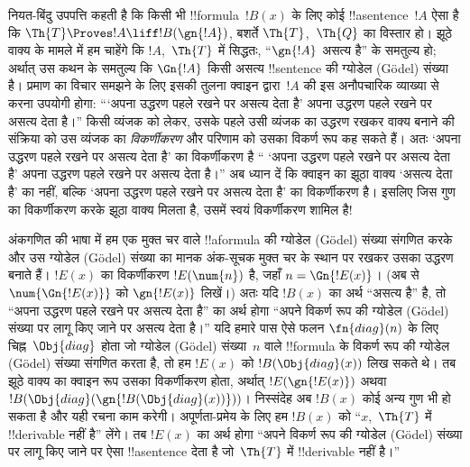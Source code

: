 \documentclass[../../../include/open-logic-section]{subfiles}
\begin{document}


\begin{explain}
नियत-बिंदु उपपत्ति कहती है कि किसी भी !!{formula}~$!B(x)$ के लिए कोई
!!a{sentence}~$!A$ ऐसा है कि
$\Th{T} \Proves !A \liff !B(\gn{!A})$, बशर्ते $\Th{T}$,~$\Th{Q}$ का
विस्तार हो। झूठे वाक्य के मामले में हम चाहेंगे कि $!A$,~$\Th{T}$ में
सिद्धतः, ``$\gn{!A}$ असत्य है'' के समतुल्य हो; अर्थात् उस कथन के समतुल्य
कि $\Gn{!A}$ किसी असत्य !!{sentence} की ग्योडेल (G\"odel) संख्या है।
प्रमाण का विचार समझने के लिए इसकी तुलना क्वाइन द्वारा~$!A$ की इस अनौपचारिक
व्याख्या से करना उपयोगी होगा: ```अपना उद्धरण पहले रखने पर असत्य देता है'
अपना उद्धरण पहले रखने पर असत्य देता है।'' किसी व्यंजक को लेकर, उसके पहले
उसी व्यंजक का उद्धरण रखकर वाक्य बनाने की संक्रिया को उस व्यंजक का
\emph{विकर्णीकरण} और परिणाम को उसका विकर्ण रूप कह सकते हैं। अतः `अपना
उद्धरण पहले रखने पर असत्य देता है' का विकर्णीकरण है `` `अपना उद्धरण पहले
रखने पर असत्य देता है' अपना उद्धरण पहले रखने पर असत्य देता है।'' अब ध्यान
दें कि क्वाइन का झूठा वाक्य `असत्य देता है' का नहीं, बल्कि `अपना उद्धरण
पहले रखने पर असत्य देता है' का विकर्णीकरण है। इसलिए जिस गुण का
विकर्णीकरण करके झूठा वाक्य मिलता है, उसमें स्वयं विकर्णीकरण शामिल है!{}

अंकगणित की भाषा में हम एक मुक्त चर वाले !!a{formula} की ग्योडेल (G\"odel)
संख्या संगणित करके और उस ग्योडेल (G\"odel) संख्या का मानक अंक-सूचक मुक्त चर के
स्थान पर रखकर उसका उद्धरण बनाते हैं। $!E(x)$ का विकर्णीकरण
$!E(\num{n})$ है, जहाँ $n = \Gn{!E(x)}$। (अब से
$\num{\Gn{!E(x)}}$ को $\gn{!E(x)}$ लिखें।) अतः यदि $!B(x)$ का अर्थ
``असत्य है'' है, तो ``अपना उद्धरण पहले रखने पर असत्य देता है'' का अर्थ
होगा ``अपने विकर्ण रूप की ग्योडेल (G\"odel) संख्या पर लागू किए जाने पर असत्य देता
है।'' यदि हमारे पास ऐसे फलन $\fn{diag}(n)$ के लिए चिह्न~$\Obj{diag}$ होता
जो ग्योडेल (G\"odel) संख्या~$n$ वाले !!{formula} के विकर्ण रूप की ग्योडेल (G\"odel) संख्या
संगणित करता है, तो हम $!E(x)$ को $!B(\Obj{diag}(x))$ लिख सकते थे। तब झूठे
वाक्य का क्वाइन रूप उसका विकर्णीकरण होता, अर्थात्
$!E(\gn{!E(x)})$ अथवा
$!B(\Obj{diag}(\gn{!B(\Obj{diag}(x))}))$। निस्संदेह अब $!B(x)$ कोई अन्य
गुण भी हो सकता है और यही रचना काम करेगी। अपूर्णता-प्रमेय के लिए हम
$!B(x)$ को ``$x$,~$\Th{T}$ में !!{derivable} नहीं है'' लेंगे। तब $!E(x)$
का अर्थ होगा ``अपने विकर्ण रूप की ग्योडेल (G\"odel) संख्या पर लागू किए जाने पर ऐसा
!!a{sentence} देता है जो~$\Th{T}$ में !!{derivable} नहीं है।''


\end{explain}
\end{document}
